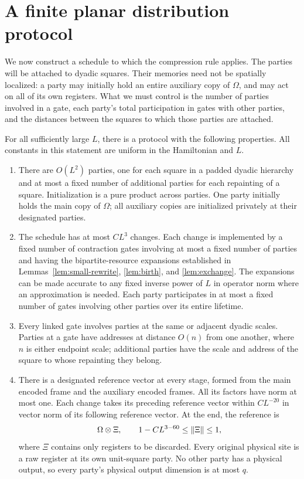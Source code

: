 \section{A finite planar distribution protocol}
\label{sec:geometry}

We now construct a schedule to which the compression rule applies.
The parties will be attached to dyadic squares.  Their memories need not
be spatially localized: a party may initially hold an entire auxiliary
copy of $\Omega$, and may act on all of its own registers.  What we must
control is the number of parties involved in a gate, each party's total
participation in gates with other parties, and the distances between the
squares to which those parties are attached.

\begin{proposition}
\label{prop:protocol}
For all sufficiently large $L$, there is a protocol with the following
properties.  All constants in this statement are uniform in the
Hamiltonian and $L$.
\begin{enumerate}
\item
There are $O(L^2)$ parties, one for each square in a padded dyadic
hierarchy and at most a fixed number of additional parties for each
repainting of a square.  Initialization is a pure product across
parties.  One party initially holds the main copy of $\Omega$; all
auxiliary copies are initialized privately at their designated parties.
\item
The schedule has at most $C L^3$ changes.  Each change is implemented by
a fixed number of contraction gates involving at most a fixed number of
parties and having the bipartite-resource expansions established in
Lemmas~\ref{lem:small-rewrite}, \ref{lem:birth}, and
\ref{lem:exchange}.  The expansions can be made accurate to any fixed
inverse power of $L$ in operator norm where an approximation is needed.
Each party participates in at most a fixed number of gates involving
other parties over its entire lifetime.
\item
Every linked gate involves parties at the same or adjacent dyadic
scales.  Parties at a gate have addresses at distance $O(n)$ from one
another, where $n$ is either endpoint scale; additional parties have the
scale and address of the square to whose repainting they belong.
\item
There is a designated reference vector at every stage, formed from the
main encoded frame and the auxiliary encoded frames.  All its factors
have norm at most one.  Each change takes its preceding reference vector
within $C L^{-20}$ in vector norm of its following reference vector.
At the end, the reference is
\[
 \Omega\otimes\Xi,
 \qquad 1-C L^{3-60}\le \lVert \Xi\rVert\le1,
\]
where $\Xi$ contains only registers to be discarded.  Every original
physical site is a raw register at its own unit-square party.  No other
party has a physical output, so every party's physical output dimension
is at most $q$.
\end{enumerate}
\end{proposition}

